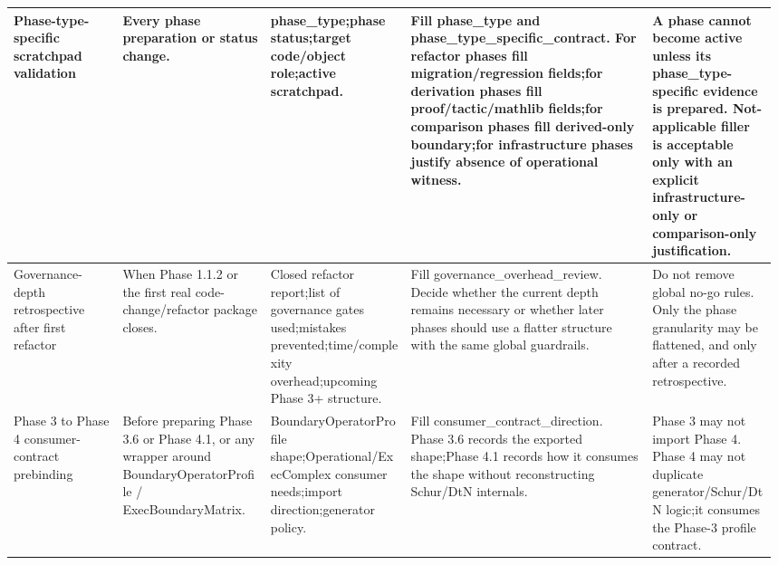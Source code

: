 \begin{longtable}{L{0.14\linewidth} L{0.19\linewidth} L{0.18\linewidth} L{0.31\linewidth} L{0.16\linewidth}}
\hline
\addlinespace[0.24em]
Phase-type-specific scratchpad validation & Every phase preparation or status change. & phase\_type;\newline phase status;\newline target code/\allowbreak{}object role;\newline active scratchpad. & Fill phase\_type and phase\_type\_specific\_contract. For refactor phases fill migration/\allowbreak{}regression fields;\newline for derivation phases fill proof/\allowbreak{}tactic/\allowbreak{}mathlib fields;\newline for comparison phases fill derived-only boundary;\newline for infrastructure phases justify absence of operational witness. & A phase cannot become active unless its phase\_type-specific evidence is prepared. Not-applicable filler is acceptable only with an explicit infrastructure-only or comparison-only justification.\\
\hline
\addlinespace[0.24em]
Governance-depth retrospective after first refactor & When Phase 1.1.2 or the first real code-change/\allowbreak{}refactor package closes. & Closed refactor report;\newline list of governance gates used;\newline mistakes prevented;\newline time/\allowbreak{}complexity overhead;\newline upcoming Phase 3+ structure. & Fill governance\_overhead\_review. Decide whether the current depth remains necessary or whether later phases should use a flatter structure with the same global guardrails. & Do not remove global no-go rules. Only the phase granularity may be flattened, and only after a recorded retrospective.\\
\hline
\addlinespace[0.24em]
Phase 3 to Phase 4 consumer-contract prebinding & Before preparing Phase 3.6 or Phase 4.1, or any wrapper around BoundaryOperatorProfile /\allowbreak{} ExecBoundaryMatrix. & BoundaryOperatorProfile shape;\newline Operational/\allowbreak{}ExecComplex consumer needs;\newline import direction;\newline generator policy. & Fill consumer\_contract\_direction. Phase 3.6 records the exported shape;\newline Phase 4.1 records how it consumes the shape without reconstructing Schur/\allowbreak{}DtN internals. & Phase 3 may not import Phase 4. Phase 4 may not duplicate generator/\allowbreak{}Schur/\allowbreak{}DtN logic;\newline it consumes the Phase-3 profile contract.\\

\end{longtable}
